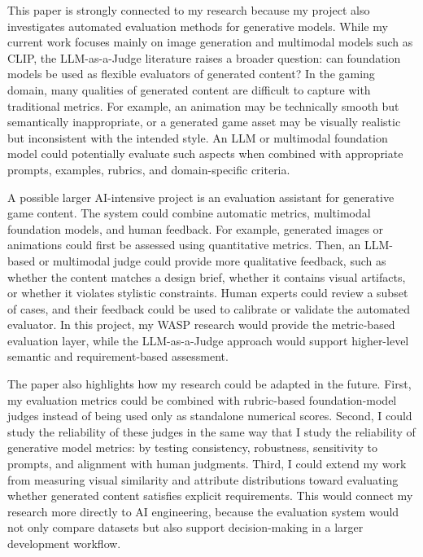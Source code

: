 \documentclass{article}
\begin{document}
This paper is strongly connected to my research because my project also investigates automated evaluation methods for generative models. While my current work focuses mainly on image generation and multimodal models such as CLIP\cite{radford2021learning}, the LLM-as-a-Judge literature raises a broader question: can foundation models be used as flexible evaluators of generated content? In the gaming domain, many qualities of generated content are difficult to capture with traditional metrics. For example, an animation may be technically smooth but semantically inappropriate, or a generated game asset may be visually realistic but inconsistent with the intended style. An LLM or multimodal foundation model could potentially evaluate such aspects when combined with appropriate prompts, examples, rubrics, and domain-specific criteria.

A possible larger AI-intensive project is an evaluation assistant for generative game content. The system could combine automatic metrics, multimodal foundation models, and human feedback. For example, generated images or animations could first be assessed using quantitative metrics. Then, an LLM-based or multimodal judge could provide more qualitative feedback, such as whether the content matches a design brief, whether it contains visual artifacts, or whether it violates stylistic constraints. Human experts could review a subset of cases, and their feedback could be used to calibrate or validate the automated evaluator. In this project, my WASP research would provide the metric-based evaluation layer, while the LLM-as-a-Judge approach would support higher-level semantic and requirement-based assessment.

The paper also highlights how my research could be adapted in the future. First, my evaluation metrics could be combined with rubric-based foundation-model judges instead of being used only as standalone numerical scores. Second, I could study the reliability of these judges in the same way that I study the reliability of generative model metrics: by testing consistency, robustness, sensitivity to prompts, and alignment with human judgments. Third, I could extend my work from measuring visual similarity and attribute distributions toward evaluating whether generated content satisfies explicit requirements. This would connect my research more directly to AI engineering, because the evaluation system would not only compare datasets but also support decision-making in a larger development workflow.
\end{document}
